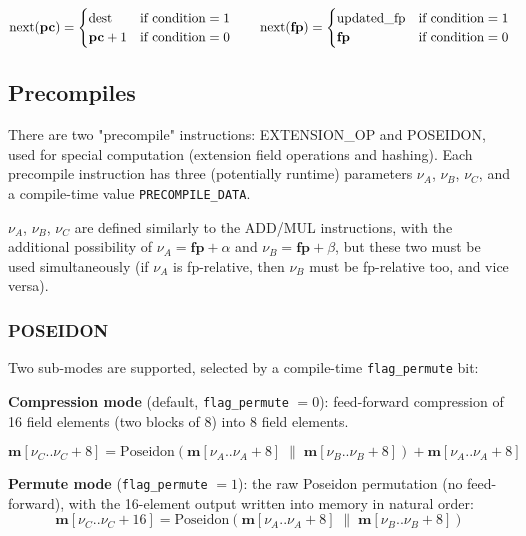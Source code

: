 \documentclass{article}
\theoremstyle{definition}
\begin{document}
$$
\text{next(\textbf{pc})} =
\begin{cases}
\text{dest} & \text{if condition} = 1 \\
\text{\textbf{pc}} + 1 & \text{if condition} = 0
\end{cases}
\qquad
\text{next(\textbf{fp})} =
\begin{cases}
\text{updated\_fp} & \text{if condition} = 1 \\
\textbf{fp} & \text{if condition} = 0
\end{cases}
$$

\subsection{Precompiles}

There are two "precompile" instructions: EXTENSION\_OP and POSEIDON, used for special computation (extension field operations and hashing). Each precompile instruction has three (potentially runtime) parameters $\nu_A$, $\nu_B$, $\nu_C$, and a compile-time value \texttt{PRECOMPILE\_DATA}.

$\nu_A$, $\nu_B$, $\nu_C$ are defined similarly to the ADD/MUL instructions, with the additional possibility of $\nu_A = \textbf{fp} + \alpha$ and $\nu_B = \textbf{fp} + \beta$, but these two must be used simultaneously (if $\nu_A$ is fp-relative, then $\nu_B$ must be fp-relative too, and vice versa).

\subsubsection{POSEIDON}

Two sub-modes are supported, selected by a compile-time \texttt{flag\_permute} bit:

\textbf{Compression mode} (default, \texttt{flag\_permute} $= 0$): feed-forward compression of 16 field elements (two blocks of 8) into 8 field elements.

$$
\textbf{m}[\nu_C..\nu_C + 8] = \text{Poseidon}(\textbf{m}[\nu_A..\nu_A + 8] \;\|\; \textbf{m}[\nu_B..\nu_B + 8]) + \textbf{m}[\nu_A..\nu_A + 8]
$$

\textbf{Permute mode} (\texttt{flag\_permute} $= 1$): the raw Poseidon permutation (no feed-forward), with the 16-element output written into memory in natural order:
$$
\textbf{m}[\nu_C..\nu_C + 16] = \text{Poseidon}(\textbf{m}[\nu_A..\nu_A + 8] \;\|\; \textbf{m}[\nu_B..\nu_B + 8])
$$


\vspace{2mm}
\end{document}
